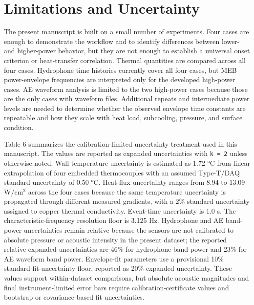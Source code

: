 \documentclass[final,1p,times]{elsarticle}
\begin{document}
\section{Limitations and Uncertainty}

The present manuscript is built on a small number of experiments. Four cases are enough to demonstrate the workflow and to identify differences between lower- and higher-power behavior, but they are not enough to establish a universal onset criterion or heat-transfer correlation. Thermal quantities are compared across all four cases. Hydrophone time histories currently cover all four cases, but MEB power-envelope frequencies are interpreted only for the developed high-power cases. AE waveform analysis is limited to the two high-power cases because those are the only cases with waveform files. Additional repeats and intermediate power levels are needed to determine whether the observed envelope time constants are repeatable and how they scale with heat load, subcooling, pressure, and surface condition.

Table 6 summarizes the calibration-limited uncertainty treatment used in this manuscript. The values are reported as expanded uncertainties with \texttt{k = 2} unless otherwise noted. Wall-temperature uncertainty is estimated as 1.72 °C from linear extrapolation of four embedded thermocouples with an assumed Type-T/DAQ standard uncertainty of 0.50 °C. Heat-flux uncertainty ranges from 8.94 to 13.09 W/cm$^2$ across the four cases because the same temperature uncertainty is propagated through different measured gradients, with a 2\% standard uncertainty assigned to copper thermal conductivity. Event-time uncertainty is 1.0 s. The characteristic-frequency resolution floor is 3.125 Hz. Hydrophone and AE band-power uncertainties remain relative because the sensors are not calibrated to absolute pressure or acoustic intensity in the present dataset; the reported relative expanded uncertainties are 46\% for hydrophone band power and 23\% for AE waveform band power. Envelope-fit parameters use a provisional 10\% standard fit-uncertainty floor, reported as 20\% expanded uncertainty. These values support within-dataset comparisons, but absolute acoustic magnitudes and final instrument-limited error bars require calibration-certificate values and bootstrap or covariance-based fit uncertainties.
\end{document}
